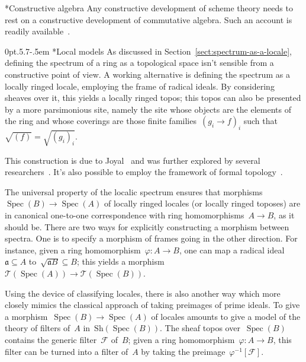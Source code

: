 \documentclass[10pt,reqno,a4paper]{amsbook}
\makeatletter
\theoremstyle{definition}
\theoremstyle{plain}
\theoremstyle{remark}
\newcommand{\F}{\mathcal{F}}
\newcommand{\T}{\mathcal{T}}
\newcommand{\aaa}{\mathfrak{a}}
\newcommand{\Sh}{\mathrm{Sh}}
\DeclareMathOperator{\Spec}{Spec}
\newcommand{\Open}{\T}
\newcommand{\?}{\,{:}\,}
\renewcommand{\_}{\mathpunct{.}\,}
\newcommand{\nocontentsline}[3]{}
\newcommand{\tocless}[1]{\let\addcontentsline=\nocontentsline}
\def\subsection{\@startsection{subsection}{2}%
  {0pt}{.5\linespacing\@plus.7\linespacing}{-.5em}%
  {\normalfont\bfseries}}
\makeatother
\begin{document}
{\tocless

\subsection*{Constructive algebra} Any constructive development of scheme
theory needs to rest on a constructive development of commutative algebra.
Such an account is readily
available~\cite{mines-richman-ruitenburg:constructive-algebra,lombardi:quitte:constructive-algebra}.

\subsection*{Local models} As discussed in
Section~\ref{sect:spectrum-as-a-locale}, defining the spectrum of a ring as a
topological space isn't sensible from a constructive point of view. A working
alternative is defining the spectrum as a locally ringed locale, employing the
frame of radical ideals. By considering sheaves over it, this yields a locally
ringed topos; this topos can also be presented by a more parsimonious site,
namely the site whose objects are the elements of the ring and whose coverings
are those finite families~$(g_i \to f)_i$ such that~$\sqrt{(f)} =
\sqrt{(g_i)_i}$.

This construction is due to
Joyal~\cite{joyal:spectrum,espanol:spectrum,tierney:spectrum} and was further explored
by several researchers~\cite{cls:spectral-schemes,cls:projective-spectrum}.
It's also possible to employ the framework of formal
topology~\cite{schuster:formal-zariski}.

The universal property of the localic spectrum ensures that morphisms~$\Spec(B)
\to \Spec(A)$ of locally ringed locales (or locally ringed toposes) are in
canonical one-to-one correspondence with ring homomorphisms~$A \to B$, as it
should be. There are two ways for explicitly constructing a morphism between
spectra. One is to specify a morphism of frames going in the other direction.
For instance, given a ring homomorphism~$\varphi : A \to B$, one can map a
radical ideal~$\aaa \subseteq A$ to~$\sqrt{\aaa B} \subseteq B$; this yields a
morphism~$\Open(\Spec(A)) \to \Open(\Spec(B))$.

Using the device of classifying locales, there is also another way which more
closely mimics the classical approach of taking preimages of prime ideals. To
give a morphism~$\Spec(B) \to \Spec(A)$ of locales amounts to give a model of
the theory of filters of~$A$ in~$\Sh(\Spec(B))$. The sheaf topos
over~$\Spec(B)$ contains the generic filter~$\F$ of~$B$; given a ring
homomorphism~$\varphi : A \to B$, this filter can be turned into a filter
of~$A$ by taking the preimage~$\varphi^{-1}[\F]$.

}
\end{document}

